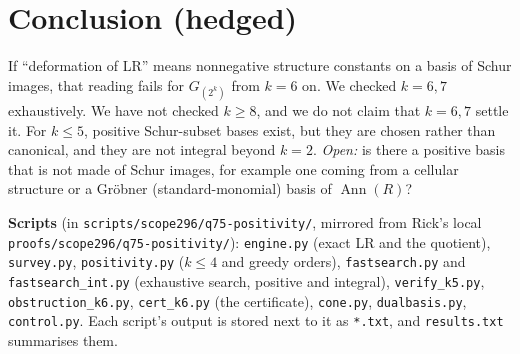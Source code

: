 \documentclass[10pt]{amsart}
\newcommand{\Ann}{\operatorname{Ann}}
\begin{document}
\section{Conclusion (hedged)}
If ``deformation of LR'' means nonnegative structure constants on a basis of Schur images, that reading fails
for $G_{(2^k)}$ from $k=6$ on. We checked $k=6,7$ exhaustively. We have not checked $k\ge8$, and we do not
claim that $k=6,7$ settle it. For $k\le5$, positive Schur-subset bases exist, but they are chosen rather than
canonical, and they are not integral beyond $k=2$.
\emph{Open:} is there a positive basis that is not made of Schur images, for example one coming from a
cellular structure or a Gr\"obner (standard-monomial) basis of $\Ann(R)$?

\medskip
\noindent\textbf{Scripts} (in \texttt{scripts/scope296/q75-positivity/}, mirrored from Rick's local
\texttt{proofs/scope296/q75-positivity/}): \texttt{engine.py} (exact LR and the quotient),
\texttt{survey.py}, \texttt{positivity.py} ($k\le4$ and greedy orders), \texttt{fastsearch.py}
and \texttt{fastsearch\_int.py} (exhaustive search, positive and integral), \texttt{verify\_k5.py},
\texttt{obstruction\_k6.py}, \texttt{cert\_k6.py} (the certificate), \texttt{cone.py}, \texttt{dualbasis.py},
\texttt{control.py}. Each script's output is stored next to it as \texttt{*.txt}, and \texttt{results.txt}
summarises them.
\end{document}
